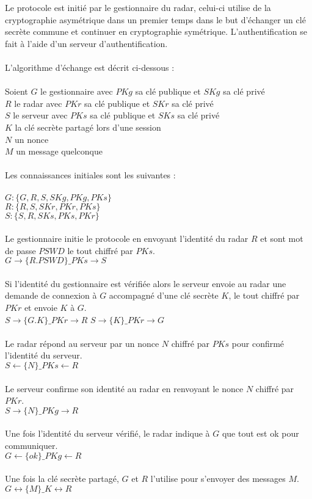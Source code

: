 \documentclass[]{scrartcl}
\begin{document}
Le protocole est initié par le gestionnaire du radar, celui-ci utilise de la cryptographie asymétrique dans un premier temps dans le but d'échanger un clé secrète commune et continuer en cryptographie symétrique. L'authentification se fait à l'aide d'un serveur d'authentification.
\\
\\
L'algorithme d'échange est décrit ci-dessous : 
\\
\\
Soient 
$G$ le gestionnaire avec $PKg$ sa clé publique et  $SKg$ sa clé privé
\\
$R$ le radar avec $PKr$ sa clé publique et  $SKr$ sa clé privé
\\
$S$ le serveur avec $PKs$ sa clé publique et  $SKs$ sa clé privé
\\
$K$ la clé secrète partagé lors d'une session
\\
$N$ un nonce
\\
$M$ un message quelconque
\\
\\
Les connaissances initiales sont les suivantes :
\\
\\
$G : \{G, R, S, SKg, PKg, PKs\}$
\\
$R : \{R, S, SKr, PKr, PKs\}$
\\
$S : \{S, R, SKs, PKs, PKr\}$
\\
\\
Le gestionnaire initie le protocole en envoyant l'identité du radar $R$ et sont mot de passe $PSWD$ le tout chiffré par $PKs$.
\\
$G \rightarrow \{R.PSWD\}\_PKs \longrightarrow S$
\\
\\
Si l'identité du gestionnaire est vérifiée alors le serveur envoie au radar une demande de connexion à $G$ accompagné d'une clé secrète $K$, le tout chiffré par $PKr$ et envoie $K$ à $G$.
\\
$S \rightarrow \{G.K\}\_PKr \longrightarrow R$
$S \rightarrow \{K\}\_PKr \longrightarrow G$
\\
\\
Le radar répond au serveur par un nonce $N$ chiffré par $PKs$ pour confirmé l'identité du serveur.
\\
$S \longleftarrow \{N\}\_PKs \leftarrow R$
\\
\\
Le serveur confirme son identité au radar en renvoyant le nonce $N$ chiffré par $PKr$.
\\
$S \rightarrow \{N\}\_PKg \longrightarrow R$
\\
\\
Une fois l'identité du serveur vérifié, le radar indique à $G$ que tout est ok pour communiquer.
\\
$G \longleftarrow \{ok\}\_PKg \leftarrow R$
\\
\\
Une fois la clé secrète partagé, $G$ et $R$ l'utilise pour s'envoyer des messages $M$.
\\

$G \leftrightarrow \{M\}\_K \leftrightarrow R$
\\
\\
\end{document}
